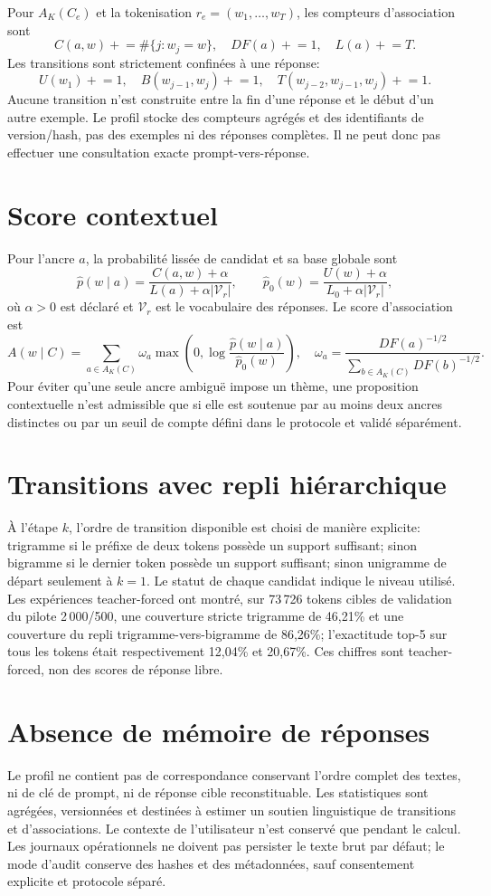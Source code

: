 \documentclass[11pt,a4paper]{report}
\newcommand{\V}{\mathcal V}
\begin{document}
Pour $A_K(C_e)$ et la tokenisation $r_e=(w_1,\ldots,w_T)$, les compteurs d'association sont
\[
 C(a,w)\mathrel{+}=\#\{j:w_j=w\},\quad
 DF(a)\mathrel{+}=1,\quad
 L(a)\mathrel{+}=T.
\]
Les transitions sont strictement confinées à une réponse:
\[
 U(w_1)\mathrel{+}=1,\quad B(w_{j-1},w_j)\mathrel{+}=1,\quad
 T(w_{j-2},w_{j-1},w_j)\mathrel{+}=1.
\]
Aucune transition n'est construite entre la fin d'une réponse et le début d'un autre exemple. Le profil stocke des compteurs agrégés et des identifiants de version/hash, pas des exemples ni des réponses complètes. Il ne peut donc pas effectuer une consultation exacte prompt-vers-réponse.

\section{Score contextuel}
Pour l'ancre $a$, la probabilité lissée de candidat et sa base globale sont
\[
 \hat p(w\mid a)=\frac{C(a,w)+\alpha}{L(a)+\alpha|\V_r|},\qquad
 \hat p_0(w)=\frac{U(w)+\alpha}{L_0+\alpha|\V_r|},
\]
où $\alpha>0$ est déclaré et $\V_r$ est le vocabulaire des réponses. Le score d'association est
\[
 A(w\mid C)=\sum_{a\in A_K(C)}\omega_a\max\left(0,\log\frac{\hat p(w\mid a)}{\hat p_0(w)}\right),
\quad
\omega_a=\frac{DF(a)^{-1/2}}{\sum_{b\in A_K(C)}DF(b)^{-1/2}}.
\]
Pour éviter qu'une seule ancre ambiguë impose un thème, une proposition contextuelle n'est admissible que si elle est soutenue par au moins deux ancres distinctes ou par un seuil de compte défini dans le protocole et validé séparément.

\section{Transitions avec repli hiérarchique}
À l'étape $k$, l'ordre de transition disponible est choisi de manière explicite: trigramme si le préfixe de deux tokens possède un support suffisant; sinon bigramme si le dernier token possède un support suffisant; sinon unigramme de départ seulement à $k=1$. Le statut de chaque candidat indique le niveau utilisé. Les expériences teacher-forced ont montré, sur 73\,726 tokens cibles de validation du pilote 2\,000/500, une couverture stricte trigramme de 46,21\% et une couverture du repli trigramme-vers-bigramme de 86,26\%; l'exactitude top-5 sur tous les tokens était respectivement 12,04\% et 20,67\%. Ces chiffres sont teacher-forced, non des scores de réponse libre.

\section{Absence de mémoire de réponses}
Le profil ne contient pas de correspondance conservant l'ordre complet des textes, ni de clé de prompt, ni de réponse cible reconstituable. Les statistiques sont agrégées, versionnées et destinées à estimer un soutien linguistique de transitions et d'associations. Le contexte de l'utilisateur n'est conservé que pendant le calcul. Les journaux opérationnels ne doivent pas persister le texte brut par défaut; le mode d'audit conserve des hashes et des métadonnées, sauf consentement explicite et protocole séparé.
\end{document}
